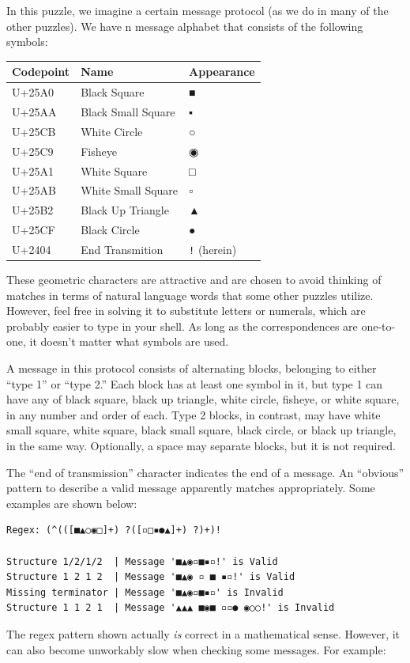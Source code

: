 In this puzzle, we imagine a certain message protocol (as we do in many
of the other puzzles). We have n message alphabet that consists of the
following symbols:

\begin{longtable}[]{@{}lll@{}}
\toprule
Codepoint & Name & Appearance\tabularnewline
\midrule
\endhead
U+25A0 & Black Square & ■\tabularnewline
U+25AA & Black Small Square & ▪\tabularnewline
U+25CB & White Circle & ○\tabularnewline
U+25C9 & Fisheye & ◉\tabularnewline
U+25A1 & White Square & □\tabularnewline
U+25AB & White Small Square & ▫\tabularnewline
U+25B2 & Black Up Triangle & ▲\tabularnewline
U+25CF & Black Circle & ●\tabularnewline
U+2404 & End Transmition & \texttt{!} (herein)\tabularnewline
\bottomrule
\end{longtable}

These geometric characters are attractive and are chosen to avoid
thinking of matches in terms of natural language words that some other
puzzles utilize. However, feel free in solving it to substitute letters
or numerals, which are probably easier to type in your shell. As long as
the correspondences are one-to-one, it doesn't matter what symbols are
used.

A message in this protocol consists of alternating blocks, belonging to
either ``type 1'' or ``type 2.'' Each block has at least one symbol in
it, but type 1 can have any of black square, black up triangle, white
circle, fisheye, or white square, in any number and order of each. Type
2 blocks, in contrast, may have white small square, white square, black
small square, black circle, or black up triangle, in the same way.
Optionally, a space may separate blocks, but it is not required.

The ``end of transmission'' character indicates the end of a message. An
``obvious'' pattern to describe a valid message apparently matches
appropriately. Some examples are shown below:

\begin{verbatim}
Regex: (^(([■▲○◉□]+) ?([▫□▪●▲]+) ?)+)!

Structure 1/2/1/2  | Message '■▲◉▫■▪▫!' is Valid
Structure 1 2 1 2  | Message '■▲◉ ▫ ■ ▪▫!' is Valid
Missing terminator | Message '■▲◉▫■▪▫' is Invalid
Structure 1 1 2 1  | Message '▲▲▲ ■◉■ ▫▫● ◉○○!' is Invalid
\end{verbatim}

The regex pattern shown actually \emph{is} correct in a mathematical
sense. However, it can also become unworkably slow when checking some
messages. For example:

